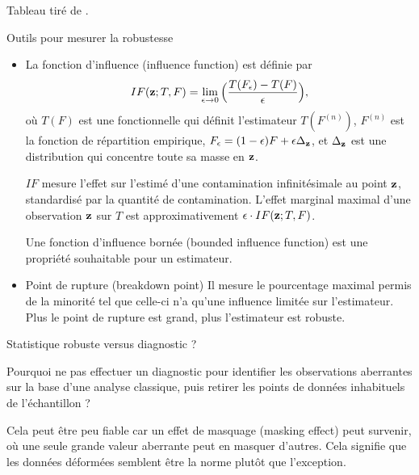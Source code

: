 \documentclass{BeamerTemplate}
\begin{document}
\begin{refsection}
\begin{frame}{}
Tableau tiré de .
\end{frame}

\begin{frame}{Outils pour mesurer la robustesse}
\begin{itemize}
\item La {\color{blue}fonction d'influence (influence function)} est définie par
$$IF({\bf z}; T , F) = \lim_{\epsilon \rightarrow 0} \Big(\frac{T(F_{\epsilon}) -
  T(F)}{\epsilon} \Big),$$
où $T(F)$ est une fonctionnelle qui définit l'estimateur $T(F^{(n)})$, $F^{(n)}$ est la fonction de répartition empirique, $F_{\epsilon} = (1-\epsilon) F + \epsilon \Delta_{\bf z}$, et $\Delta_{\bf z}$ est une distribution qui concentre toute sa masse en ${\bf z}$.

$IF$ mesure l'effet sur l'estimé d'une contamination infinitésimale au point ${\bf z}$, standardisé par la quantité de contamination. L'effet marginal maximal d'une observation ${\bf z}$ sur $T$ est approximativement $\epsilon \cdot IF({\bf z}; T , F)$.

Une {\color{blue}fonction d'influence bornée (bounded influence function)} est une propriété souhaitable pour un estimateur.
\end{itemize}
\end{frame}

\begin{frame}{}
\begin{itemize}
\item {\color{blue}Point de rupture (breakdown point)} Il mesure le pourcentage maximal permis de la minorité tel que celle-ci n'a qu'une influence limitée sur l'estimateur. Plus le point de rupture est {\color{blue}grand}, plus l'estimateur est robuste.
\end{itemize}
\end{frame}

\begin{frame}{Statistique robuste versus diagnostic ?}

\bigskip
Pourquoi ne pas effectuer un diagnostic pour identifier les observations aberrantes sur la base d'une analyse classique, puis retirer les points de données inhabituels de l'échantillon ?

\bigskip
Cela peut être peu fiable car un {\color{blue}effet de masquage (masking effect)} peut survenir, où une seule grande valeur aberrante peut en masquer d'autres. Cela signifie que les données déformées semblent être la norme plutôt que l'exception.


\end{frame}
\end{refsection}
\end{document}
